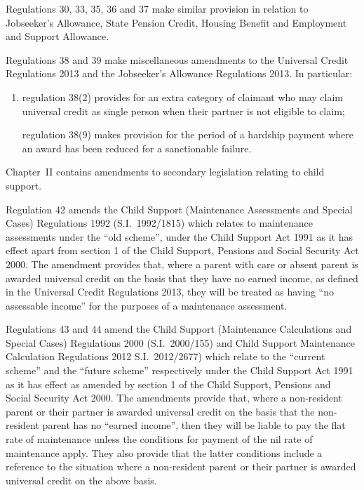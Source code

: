 \documentclass[12pt,a4paper]{article}
\begin{document}
Regulations 30, 33, 35, 36 and 37 make similar provision in relation to Jobseeker’s Allowance, State Pension Credit, Housing Benefit and Employment and Support Allowance.

Regulations 38 and 39 make miscellaneous amendments to the Universal Credit Regulations 2013 and the Jobseeker’s Allowance Regulations 2013. In particular:
\begin{enumerate}\item[]
    regulation 38(2) provides for an extra category of claimant who may claim universal credit as single person when their partner is not eligible to claim;

    regulation 38(9) makes provision for the period of a hardship payment where an award has been reduced for a sanctionable failure.
\end{enumerate}

Chapter~II contains amendments to secondary legislation relating to child support.

Regulation 42 amends the Child Support (Maintenance Assessments and Special Cases) Regulations 1992 (S.I.~1992/1815) which relates to maintenance assessments under the “old scheme”, under the Child Support Act 1991 as it has effect apart from section 1 of the Child Support, Pensions and Social Security Act 2000. The amendment provides that, where a parent with care or absent parent is awarded universal credit on the basis that they have no earned income, as defined in the Universal Credit Regulations 2013, they will be treated as having “no assessable income” for the purposes of a maintenance assessment.

Regulations 43 and 44 amend the Child Support (Maintenance Calculations and Special Cases) Regulations 2000 (S.I.~2000/155) and Child Support Maintenance Calculation Regulations 2012 S.I.~2012/2677) which relate to the “current scheme” and the “future scheme” respectively under the Child Support Act 1991 as it has effect as amended by section 1 of the Child Support, Pensions and Social Security Act 2000. The amendments provide that, where a non-resident parent or their partner is awarded universal credit on the basis that the non-resident parent has no “earned income”, then they will be liable to pay the flat rate of maintenance unless the conditions for payment of the nil rate of maintenance apply. They also provide that the latter conditions include a reference to the situation where a non-resident parent or their partner is awarded universal credit on the above basis.
\end{document}
